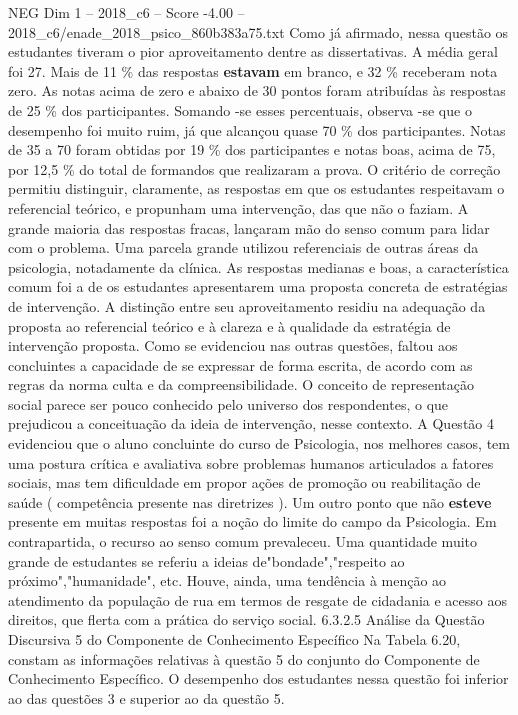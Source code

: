 \begin{textsample}{NEG Dim 1 – 2018\_c6 – Score -4.00 – 2018\_c6/enade\_2018\_psico\_860b383a75.txt}
Como já afirmado, nessa questão os estudantes tiveram o pior aproveitamento dentre as dissertativas.
A média geral foi 27.
Mais de 11 \% das respostas \textbf{estavam} em branco, e 32 \% receberam nota zero.
As notas acima de zero e abaixo de 30 pontos foram atribuídas às respostas de 25 \% dos participantes.
Somando -se esses percentuais, observa -se que o desempenho foi muito ruim, já que alcançou quase 70 \% dos participantes.
Notas de 35 a 70 foram obtidas por 19 \% dos participantes e notas boas, acima de 75, por 12,5 \% do total de formandos que realizaram a prova.
O critério de correção permitiu distinguir, claramente, as respostas em que os estudantes respeitavam o referencial teórico, e propunham uma intervenção, das que não o faziam.
A grande maioria das respostas fracas, lançaram mão do senso comum para lidar com o problema.
Uma parcela grande utilizou referenciais de outras áreas da psicologia, notadamente da clínica.
As respostas medianas e boas, a característica comum foi a de os estudantes apresentarem uma proposta concreta de estratégias de intervenção.
A distinção entre seu aproveitamento residiu na adequação da proposta ao referencial teórico e à clareza e à qualidade da estratégia de intervenção proposta.
Como se evidenciou nas outras questões, faltou aos concluintes a capacidade de se expressar de forma escrita, de acordo com as regras da norma culta e da compreensibilidade.
O conceito de representação social parece ser pouco conhecido pelo universo dos respondentes, o que prejudicou a conceituação da ideia de intervenção, nesse contexto.
A Questão 4 evidenciou que o aluno concluinte do curso de Psicologia, nos melhores casos, tem uma postura crítica e avaliativa sobre problemas humanos articulados a fatores sociais, mas tem dificuldade em propor ações de promoção ou reabilitação de saúde ( competência presente nas diretrizes ).
Um outro ponto que não \textbf{esteve} presente em muitas respostas foi a noção do limite do campo da Psicologia.
Em contrapartida, o recurso ao senso comum prevaleceu.
Uma quantidade muito grande de estudantes se referiu a ideias de"bondade","respeito ao próximo","humanidade", etc.
Houve, ainda, uma tendência à menção ao atendimento da população de rua em termos de resgate de cidadania e acesso aos direitos, que flerta com a prática do serviço social. 6.3.2.5 Análise da Questão Discursiva 5 do Componente de Conhecimento Específico Na Tabela 6.20, constam as informações relativas à questão 5 do conjunto do Componente de Conhecimento Específico.
O desempenho dos estudantes nessa questão foi inferior ao das questões 3 e superior ao da questão 5.

\end{textsample}
